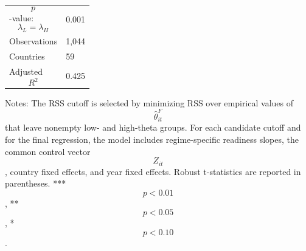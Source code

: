 \begin{table}[H]
\begin{threeparttable}
\begin{tabularx}{\textwidth}{lY}
$$p$$-value: $$\lambda_L=\lambda_H$$ & 0.001 \\
Observations & 1,044 \\
Countries & 59 \\
Adjusted $$R^2$$ & 0.425 \\
\bottomrule
\end{tabularx}
\begin{tablenotes}[flushleft]\footnotesize
\item Notes: The RSS cutoff is selected by minimizing RSS over empirical values of $$\widehat{\theta}^{F}_{it}$$ that leave nonempty low- and high-theta groups. For each candidate cutoff and for the final regression, the model includes regime-specific readiness slopes, the common control vector $$Z_{it}$$, country fixed effects, and year fixed effects. Robust t-statistics are reported in parentheses. *** $$p<0.01$$, ** $$p<0.05$$, * $$p<0.10$$.
\end{tablenotes}
\end{threeparttable}
\end{table}
